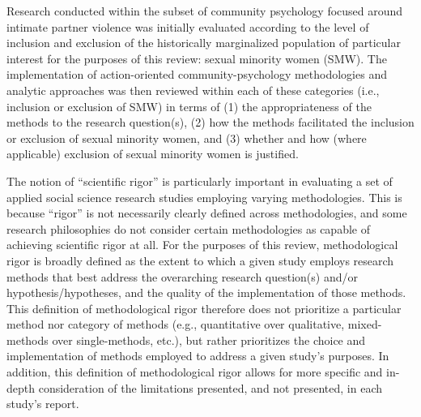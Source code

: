 \documentclass[11pt,]{tufte-book}
\begin{document}

Research conducted within the subset of community psychology focused
around intimate partner violence was initially evaluated according to
the level of inclusion and exclusion of the historically marginalized
population of particular interest for the purposes of this review:
sexual minority women (SMW). The implementation of action-oriented
community-psychology methodologies and analytic approaches was then
reviewed within each of these categories (i.e., inclusion or exclusion
of SMW) in terms of (1) the appropriateness of the methods to the
research question(s), (2) how the methods facilitated the inclusion or
exclusion of sexual minority women, and (3) whether and how (where
applicable) exclusion of sexual minority women is justified.


The notion of ``scientific rigor'' is particularly important in
evaluating a set of applied social science research studies employing
varying methodologies. This is because ``rigor'' is not necessarily
clearly defined across methodologies, and some research philosophies do
not consider certain methodologies as capable of achieving scientific
rigor at all. For the purposes of this review, methodological rigor is
broadly defined as the extent to which a given study employs research
methods that best address the overarching research question(s) and/or
hypothesis/hypotheses, and the quality of the implementation of those
methods. This definition of methodological rigor therefore does not
prioritize a particular method nor category of methods (e.g.,
quantitative over qualitative, mixed-methods over single-methods, etc.),
but rather prioritizes the choice and implementation of methods employed
to address a given study's purposes. In addition, this definition of
methodological rigor allows for more specific and in-depth consideration
of the limitations presented, and not presented, in each study's report.
\end{document}
